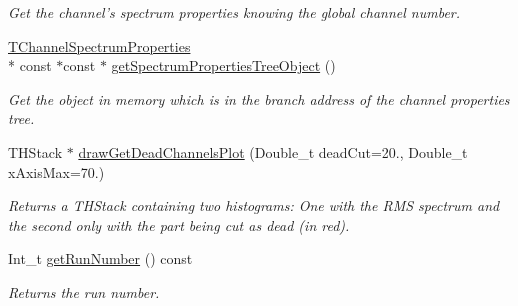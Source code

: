 \begin{DoxyCompactItemize}
\begin{DoxyCompactList}\small\item\em Get the channel's spectrum properties knowing the global channel number. \end{DoxyCompactList}\item 
\hyperlink{class_t_channel_spectrum_properties}{T\-Channel\-Spectrum\-Properties} \\*
const $\ast$const $\ast$ \hyperlink{class_spectrum_properties_run_info_a13a12de80cf8fce594345616da473856}{get\-Spectrum\-Properties\-Tree\-Object} ()
\begin{DoxyCompactList}\small\item\em Get the object in memory which is in the branch address of the channel properties tree. \end{DoxyCompactList}\item 
T\-H\-Stack $\ast$ \hyperlink{class_spectrum_properties_run_info_a4cce9dcb12a35b4c43d6e6efdd906b01}{draw\-Get\-Dead\-Channels\-Plot} (Double\-\_\-t dead\-Cut=20., Double\-\_\-t x\-Axis\-Max=70.)
\begin{DoxyCompactList}\small\item\em Returns a T\-H\-Stack containing two histograms\-: One with the R\-M\-S spectrum and the second only with the part being cut as dead (in red). \end{DoxyCompactList}\item 
Int\-\_\-t \hyperlink{class_spectrum_properties_run_info_a54c0276d0cfdda159644c833ef35a492}{get\-Run\-Number} () const 
\begin{DoxyCompactList}\small\item\em Returns the run number. \end{DoxyCompactList}\end{DoxyCompactItemize}

